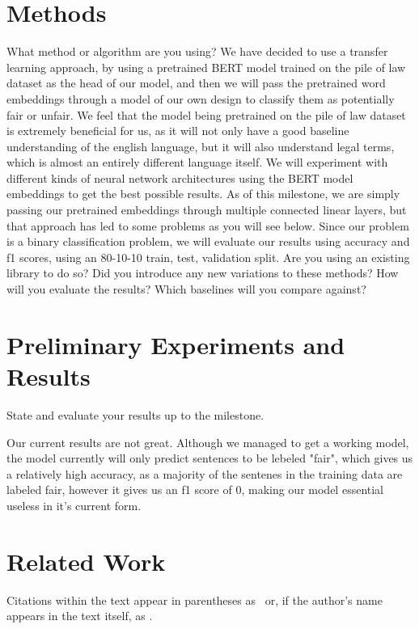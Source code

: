 \documentclass[11pt,a4paper]{article}
\begin{document}
\section{Methods}

What method or algorithm are you using?
We have decided to use a transfer learning approach, by using a pretrained BERT model trained on the pile of law dataset as the head of our model, and then we will pass the pretrained word embeddings through a model of our own design to classify them as potentially fair or unfair. We feel that the model being pretrained on the pile of law dataset is extremely beneficial for us, as it will not only have a good baseline understanding of the english language, but it will also understand legal terms, which is almost an entirely different language itself.
We will experiment with different kinds of neural network architectures using the BERT model embeddings to get the best possible results. As of this milestone, we are simply passing our pretrained embeddings through multiple connected linear layers, but that approach has led to some problems as you will see below.
Since our problem is a binary classification problem, we will evaluate our results using accuracy and f1 scores, using an 80-10-10 train, test, validation split.
Are you using an existing library to do so? 
Did you introduce any new variations to these methods? 
How will you evaluate the results? 
Which baselines will you compare against?


\section{Preliminary Experiments and Results}

State and evaluate your results up to the milestone.

Our current results are not great. Although we managed to get a working model, the model currently will only predict sentences to be lebeled "fair", which gives us a relatively high accuracy, as a majority of the sentenes in the training data are labeled fair, however it gives us an f1 score of 0, making our model essential useless in it's current form. 

\section{Related Work}

Citations within the text appear in parentheses as~\citep{aho1972theory} or, if the author's name appears in the text itself, as \citet{andrew2007scalable}.
\end{document}
